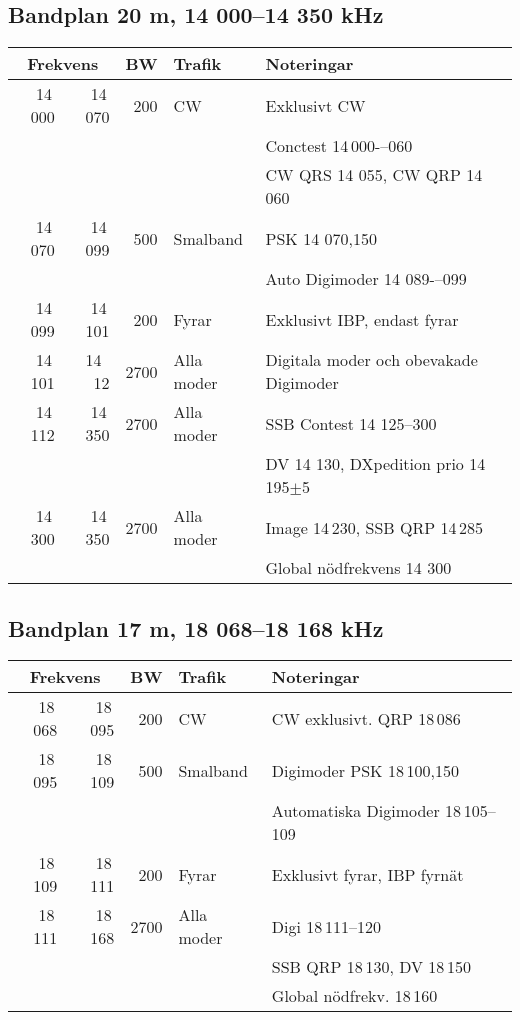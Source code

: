 \subsection{Bandplan 20 m, 14 000--14 350 kHz}
\begin{tabular}{rrrll}
\multicolumn{2}{c}{\textbf{Frekvens}} & \textbf{BW} & \textbf{Trafik} & \textbf{Noteringar} \\ \hline
14\,000 & 14\,070 & 200  & CW         & Exklusivt CW                             \\
        &         &      &            & Conctest 14\,000-–060                    \\
        &         &      &            & CW QRS 14 055, CW QRP 14\,060            \\ \hline
14\,070 & 14\,099 & 500  & Smalband   & PSK 14 070,150                           \\
        &         &      &            & Auto Digimoder 14 089-–099               \\ \hline
14\,099 & 14\,101 & 200  & Fyrar      & Exklusivt IBP, endast fyrar              \\ \hline
14\,101 & 14 \,12 & 2700 & Alla moder & Digitala moder och obevakade Digimoder   \\ \hline
14\,112 & 14\,350 & 2700 & Alla moder & SSB Contest 14 125--300                  \\
        &         &      &            & DV 14 130, DXpedition prio 14\,195$\pm$5 \\ \hline
14\,300 & 14\,350 & 2700 & Alla moder & Image 14\,230, SSB QRP 14\,285           \\
        &         &      &            & Global nödfrekvens 14 300                \\ \hline
\end{tabular}

\subsection{Bandplan 17 m, 18 068--18 168 kHz}
\begin{tabular}{rrrll}
\multicolumn{2}{c}{\textbf{Frekvens}} & \textbf{BW} & \textbf{Trafik} & \textbf{Noteringar} \\ \hline

18\,068 & 18\,095 & 200  & CW         & CW exklusivt. QRP 18\,086             \\ \hline
18\,095 & 18\,109 & 500  & Smalband   & Digimoder PSK 18\,100,150             \\
        &         &      &            & Automatiska Digimoder 18\,105--109 \\ \hline
18\,109 & 18\,111 & 200  & Fyrar      & Exklusivt fyrar, IBP fyrnät           \\ \hline
18\,111 & 18\,168 & 2700 & Alla moder & Digi 18\,111--120                   \\
        &         &      &            & SSB QRP 18\,130, DV 18\,150           \\
        &         &      &            & Global nödfrekv. 18\,160              \\ \hline
\end{tabular}

